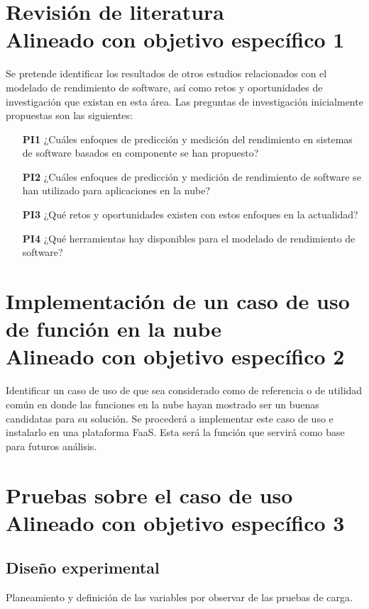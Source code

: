 \section[Revisión de literatura]{Revisión de literatura\\\small{Alineado con objetivo específico 1}}
Se pretende identificar los resultados de otros estudios relacionados con el modelado de rendimiento de software, así como retos y oportunidades de investigación que existan en esta área. Las preguntas de investigación inicialmente propuestas son las siguientes:
\begin{itemize}
    \item[\textbf{PI1}] ¿Cuáles enfoques de predicción y medición del rendimiento en sistemas de software basados en componente se han propuesto?
    \item[\textbf{PI2}] ¿Cuáles enfoques de predicción y medición de rendimiento de software se han utilizado para aplicaciones en la nube?
    \item[\textbf{PI3}] ¿Qué retos y oportunidades existen con estos enfoques en la actualidad?
    \item[\textbf{PI4}] ¿Qué herramientas hay disponibles para el modelado de rendimiento de software?
\end{itemize}

\section[Implementación de caso de uso de función en la nube]{Implementación de un caso de uso de función en la nube\\\small{Alineado con objetivo específico 2}}

Identificar un caso de uso de que sea considerado como de referencia o de utilidad común en donde las funciones en la nube hayan mostrado ser un buenas candidatas para su solución. Se procederá a implementar este caso de uso e instalarlo en una plataforma FaaS. Esta será la función que servirá como base para futuros análisis.

\section[Pruebas sobre el caso de uso]{Pruebas sobre el caso de uso\\\small{Alineado con objetivo específico 3}}

\subsection{Diseño experimental}
Planeamiento y definición de las variables por observar de las pruebas de carga.

